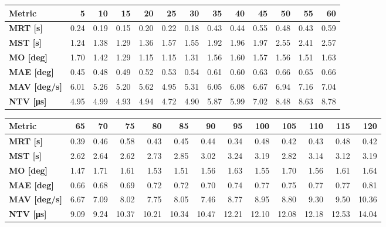 \begin{tabular*}{\textwidth}{@{\extracolsep{\fill}}l|rrrrrrrrrrrr}
    \toprule
    \textbf{Metric} & \textbf{5} & \textbf{10} & \textbf{15} & \textbf{20} & \textbf{25} & \textbf{30} & \textbf{35} & \textbf{40} & \textbf{45} & \textbf{50} & \textbf{55} & \textbf{60} \\
    \midrule
    \textbf{MRT [s]} & 0.24 & 0.19 & 0.15 & 0.20 & 0.22 & 0.18 & 0.43 & 0.44 & 0.55 & 0.48 & 0.43 & 0.59 \\
    \textbf{MST [s]} & 1.24 & 1.38 & 1.29 & 1.36 & 1.57 & 1.55 & 1.92 & 1.96 & 1.97 & 2.55 & 2.41 & 2.57 \\
    \textbf{MO  [deg]} & 1.70 & 1.42 & 1.29 & 1.15 & 1.15 & 1.31 & 1.56 & 1.60 & 1.57 & 1.56 & 1.51 & 1.63 \\
    \textbf{MAE [deg]} & 0.45 & 0.48 & 0.49 & 0.52 & 0.53 & 0.54 & 0.61 & 0.60 & 0.63 & 0.66 & 0.65 & 0.66 \\
    \textbf{MAV [deg/s]} & 6.01 & 5.26 & 5.20 & 5.62 & 4.95 & 5.31 & 6.05 & 6.08 & 6.67 & 6.94 & 7.16 & 7.04 \\
    \textbf{NTV [\si{\micro\second}]} & 4.95 & 4.99 & 4.93 & 4.94 & 4.72 & 4.90 & 5.87 & 5.99 & 7.02 & 8.48 & 8.63 & 8.78 \\
    \bottomrule
\end{tabular*}

\begin{tabular*}{\textwidth}{@{\extracolsep{\fill}}l|rrrrrrrrrrrr}
    \toprule
    \textbf{Metric} & \textbf{65} & \textbf{70} & \textbf{75} & \textbf{80} & \textbf{85} & \textbf{90} & \textbf{95} & \textbf{100} & \textbf{105} & \textbf{110} & \textbf{115} & \textbf{120} \\
    \midrule
    \textbf{MRT [s]} & 0.39 & 0.46 & 0.58 & 0.43 & 0.45 & 0.44 & 0.34 & 0.48 & 0.42 & 0.43 & 0.48 & 0.42 \\
    \textbf{MST [s]} & 2.62 & 2.64 & 2.62 & 2.73 & 2.85 & 3.02 & 3.24 & 3.19 & 2.82 & 3.14 & 3.12 & 3.19 \\
    \textbf{MO  [deg]} & 1.47 & 1.71 & 1.61 & 1.53 & 1.51 & 1.56 & 1.63 & 1.55 & 1.70 & 1.56 & 1.61 & 1.64 \\
    \textbf{MAE [deg]} & 0.66 & 0.68 & 0.69 & 0.72 & 0.72 & 0.70 & 0.74 & 0.77 & 0.75 & 0.77 & 0.77 & 0.81 \\
    \textbf{MAV [deg/s]} & 6.67 & 7.09 & 8.02 & 7.75 & 8.05 & 7.46 & 8.77 & 8.95 & 8.80 & 9.30 & 9.50 & 10.36 \\
    \textbf{NTV [\si{\micro\second}]} & 9.09 & 9.24 & 10.37 & 10.21 & 10.34 & 10.47 & 12.21 & 12.10 & 12.08 & 12.18 & 12.53 & 14.04 \\
    \bottomrule
\end{tabular*}

